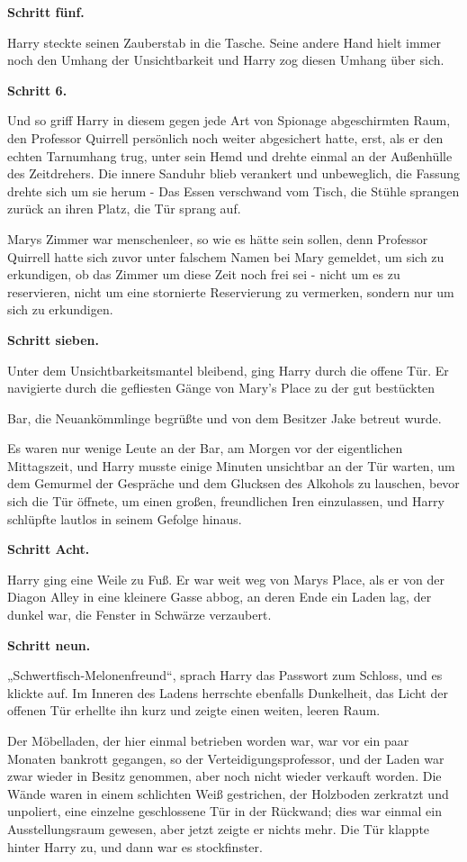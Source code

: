 {\textbf{Schritt fünf.}

Harry steckte seinen Zauberstab in die Tasche. Seine andere Hand hielt immer noch den Umhang der Unsichtbarkeit und Harry zog diesen Umhang über sich.

\textbf{Schritt 6.}

Und so griff Harry in diesem gegen jede Art von Spionage abgeschirmten Raum, den Professor Quirrell persönlich noch weiter abgesichert hatte, erst, als er den echten Tarnumhang trug, unter sein Hemd und drehte einmal an der Außenhülle des Zeitdrehers. Die innere Sanduhr blieb verankert und unbeweglich, die Fassung drehte sich um sie herum - Das Essen verschwand vom Tisch, die Stühle sprangen zurück an ihren Platz, die Tür sprang auf.

Marys Zimmer war menschenleer, so wie es hätte sein sollen, denn Professor Quirrell hatte sich zuvor unter falschem Namen bei Mary gemeldet, um sich zu erkundigen, ob das Zimmer um diese Zeit noch frei sei - nicht um es zu reservieren, nicht um eine stornierte Reservierung zu vermerken, sondern nur um sich zu erkundigen.

\textbf{Schritt sieben.}

Unter dem Unsichtbarkeitsmantel bleibend, ging Harry durch die offene Tür. Er navigierte durch die gefliesten Gänge von Mary's Place zu der gut bestückten

Bar, die Neuankömmlinge begrüßte und von dem Besitzer Jake betreut wurde.

Es waren nur wenige Leute an der Bar, am Morgen vor der eigentlichen Mittagszeit, und Harry musste einige Minuten unsichtbar an der Tür warten, um dem Gemurmel der Gespräche und dem Glucksen des Alkohols zu lauschen, bevor sich die Tür öffnete, um einen großen, freundlichen Iren einzulassen, und Harry schlüpfte lautlos in seinem Gefolge hinaus.

\textbf{Schritt Acht.}

Harry ging eine Weile zu Fuß. Er war weit weg von Marys Place, als er von der Diagon Alley in eine kleinere Gasse abbog, an deren Ende ein Laden lag, der dunkel war, die Fenster in Schwärze verzaubert.

\textbf{Schritt neun.}

„Schwertfisch-Melonenfreund“, sprach Harry das Passwort zum Schloss, und es klickte auf. Im Inneren des Ladens herrschte ebenfalls Dunkelheit, das Licht der offenen Tür erhellte ihn kurz und zeigte einen weiten, leeren Raum.

Der Möbelladen, der hier einmal betrieben worden war, war vor ein paar Monaten bankrott gegangen, so der Verteidigungsprofessor, und der Laden war zwar wieder in Besitz genommen, aber noch nicht wieder verkauft worden. Die Wände waren in einem schlichten Weiß gestrichen, der Holzboden zerkratzt und unpoliert, eine einzelne geschlossene Tür in der Rückwand; dies war einmal ein Ausstellungsraum gewesen, aber jetzt zeigte er nichts mehr. Die Tür klappte hinter Harry zu, und dann war es stockfinster.

}
